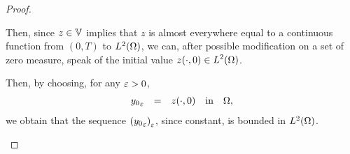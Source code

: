 \begin{proof}
\begin{enumerate}
            Then, since $z\in \mathbb{V}$ implies that $z$ is almost everywhere
            equal to a continuous function from $(0,T)$ to
            $L^{2}\!\left({\Omega}\right)$, we can, after possible modification on a set
            of zero measure, speak of the initial value $\displaystyle
            {z}\!\left({\cdot, 0}\right)\in L^{2}\!\left({\Omega}\right)$.

            Then, by choosing, for any $\varepsilon > 0$,
            \begin{equation*}
                \begin{array}{rclll}
                    {y_{0}}_{\varepsilon} & = & {z}\!\left({\cdot, 0}\right) & \text{in} &
                    \Omega,
                \end{array}
            \end{equation*}
            we obtain that the sequence
            ${\left({{y_{0}}_{\varepsilon}}\right)}_{\varepsilon}$, since constant, is
            bounded in $L^{2}\!\left({\Omega}\right)$.
    \end{enumerate}
\end{proof}
